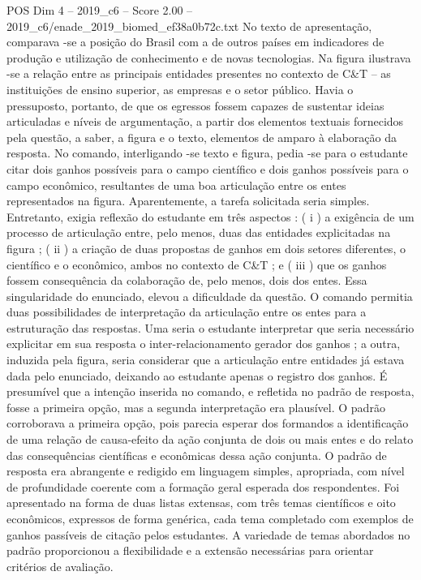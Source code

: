 \begin{textsample}{POS Dim 4 – 2019\_c6 – Score 2.00 – 2019\_c6/enade\_2019\_biomed\_ef38a0b72c.txt}
No texto de apresentação, comparava -se a posição do Brasil com a de outros países em indicadores de produção e utilização de conhecimento e de novas tecnologias.
Na figura ilustrava -se a relação entre as principais entidades presentes no contexto de C\&T – as instituições de ensino superior, as empresas e o setor público.
Havia o pressuposto, portanto, de que os egressos fossem capazes de sustentar ideias articuladas e níveis de argumentação, a partir dos elementos textuais fornecidos pela questão, a saber, a figura e o texto, elementos de amparo à elaboração da resposta.
No comando, interligando -se texto e figura, pedia -se para o estudante citar dois ganhos possíveis para o campo científico e dois ganhos possíveis para o campo econômico, resultantes de uma boa articulação entre os entes representados na figura.
Aparentemente, a tarefa solicitada seria simples.
Entretanto, exigia reflexão do estudante em três aspectos : ( i ) a exigência de um processo de articulação entre, pelo menos, duas das entidades explicitadas na figura ; ( ii ) a criação de duas propostas de ganhos em dois setores diferentes, o científico e o econômico, ambos no contexto de C\&T ; e ( iii ) que os ganhos fossem consequência da colaboração de, pelo menos, dois dos entes.
Essa singularidade do enunciado, elevou a dificuldade da questão.
O comando permitia duas possibilidades de interpretação da articulação entre os entes para a estruturação das respostas.
Uma seria o estudante interpretar que seria necessário explicitar em sua resposta o inter-relacionamento gerador dos ganhos ; a outra, induzida pela figura, seria considerar que a articulação entre entidades já estava dada pelo enunciado, deixando ao estudante apenas o registro dos ganhos.
É presumível que a intenção inserida no comando, e refletida no padrão de resposta, fosse a primeira opção, mas a segunda interpretação era plausível.
O padrão corroborava a primeira opção, pois parecia esperar dos formandos a identificação de uma relação de causa-efeito da ação conjunta de dois ou mais entes e do relato das consequências científicas e econômicas dessa ação conjunta.
O padrão de resposta era abrangente e redigido em linguagem simples, apropriada, com nível de profundidade coerente com a formação geral esperada dos respondentes.
Foi apresentado na forma de duas listas extensas, com três temas científicos e oito econômicos, expressos de forma genérica, cada tema completado com exemplos de ganhos passíveis de citação pelos estudantes.
A variedade de temas abordados no padrão proporcionou a flexibilidade e a extensão necessárias para orientar critérios de avaliação.

\end{textsample}
